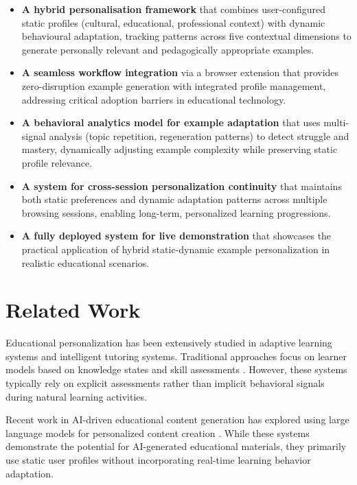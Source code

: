 \documentclass[sigconf]{acmart}
\begin{document}
\begin{itemize}
    \item \textbf{A hybrid personalisation framework} that combines user-configured static profiles (cultural, educational, professional context) with dynamic behavioural adaptation, tracking patterns across five contextual dimensions to generate personally relevant and pedagogically appropriate examples.
    
    \item \textbf{A seamless workflow integration} via a browser extension that provides zero-disruption example generation with integrated profile management, addressing critical adoption barriers in educational technology.
    
    \item \textbf{A behavioral analytics model for example adaptation} that uses multi-signal analysis (topic repetition, regeneration patterns) to detect struggle and mastery, dynamically adjusting example complexity while preserving static profile relevance.
    
    \item \textbf{A system for cross-session personalization continuity} that maintains both static preferences and dynamic adaptation patterns across multiple browsing sessions, enabling long-term, personalized learning progressions.
    
    \item \textbf{A fully deployed system for live demonstration} that showcases the practical application of hybrid static-dynamic example personalization in realistic educational scenarios.
\end{itemize}


\section{Related Work}

Educational personalization has been extensively studied in adaptive learning systems and intelligent tutoring systems. Traditional approaches focus on learner models based on knowledge states and skill assessments \cite{bayly2024personalized}. However, these systems typically rely on explicit assessments rather than implicit behavioral signals during natural learning activities.

Recent work in AI-driven educational content generation has explored using large language models for personalized content creation \cite{kasneci2023chatgpt}. While these systems demonstrate the potential for AI-generated educational materials, they primarily use static user profiles without incorporating real-time learning behavior adaptation.
\end{document}
